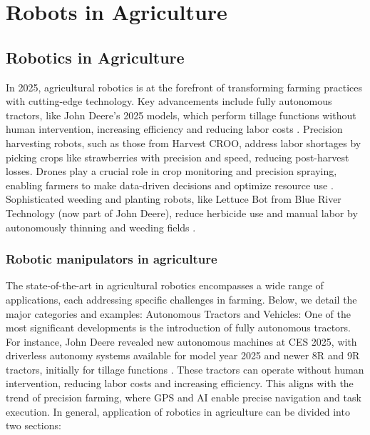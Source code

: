 \chapter{Robots in Agriculture}
\section{Robotics in Agriculture}
In 2025, agricultural robotics is at the forefront of transforming farming practices with cutting-edge technology. Key advancements include fully autonomous tractors, like John Deere's 2025 models, which perform tillage functions without human intervention, increasing efficiency and reducing labor costs \cite{DeereCES2025}. Precision harvesting robots, such as those from Harvest CROO, address labor shortages by picking crops like strawberries with precision and speed, reducing post-harvest losses. Drones play a crucial role in crop monitoring and precision spraying, enabling farmers to make data-driven decisions and optimize resource use \cite{BuiltInAgRobots}. Sophisticated weeding and planting robots, like Lettuce Bot from Blue River Technology (now part of John Deere), reduce herbicide use and manual labor by autonomously thinning and weeding fields \cite{Robovision2025}. 

\subsection{Robotic manipulators in agriculture}
The state-of-the-art in agricultural robotics encompasses a wide range of applications, each addressing specific challenges in farming. Below, we detail the major categories and examples:
Autonomous Tractors and Vehicles:
One of the most significant developments is the introduction of fully autonomous tractors. For instance, John Deere revealed new autonomous machines at CES 2025, with driverless autonomy systems available for model year 2025 and newer 8R and 9R tractors, initially for tillage functions \cite{DeereCES2025}. These tractors can operate without human intervention, reducing labor costs and increasing efficiency. This aligns with the trend of precision farming, where GPS and AI enable precise navigation and task execution. In general, application of robotics in agriculture can be divided into two sections:






